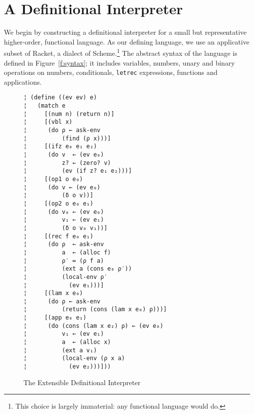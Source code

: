 \section{A Definitional Interpreter}\label{s:interp}

We begin by constructing a definitional interpreter for a small but
representative higher-order, functional language.  As our defining language, we
use an applicative subset of Racket, a dialect of Scheme.\footnote{This choice
is largely immaterial: any functional language would do.} The abstract syntax
of the language is defined in Figure~\ref{f:syntax}; it includes variables,
numbers, unary and binary operations on numbers, conditionals, {\tt letrec}
expressions, functions and applications.

\begin{figure} %
\begin{lstlisting}
¦ (define ((ev ev) e)
¦   (match e
¦     [(num n) (return n)]
¦     [(vbl x)
¦      (do ρ ← ask-env
¦          (find (ρ x)))]    
¦     [(ifz e₀ e₁ e₂) 
¦      (do v  ← (ev e₀)
¦          z? ← (zero? v)
¦          (ev (if z? e₁ e₂)))]
¦     [(op1 o e₀)
¦      (do v ← (ev e₀)
¦          (δ o v))]   
¦     [(op2 o e₀ e₁)
¦      (do v₀ ← (ev e₀)
¦          v₁ ← (ev e₁)
¦          (δ o v₀ v₁))]
¦     [(rec f e₀ e₁) 
¦      (do ρ  ← ask-env
¦          a  ← (alloc f)
¦          ρ′ ≔ (ρ f a)
¦          (ext a (cons e₀ ρ′))
¦          (local-env ρ′
¦            (ev e₁)))]
¦     [(lam x e₀)
¦      (do ρ ← ask-env
¦          (return (cons (lam x e₀) ρ)))]
¦     [(app e₀ e₁)
¦      (do (cons (lam x e₂) ρ) ← (ev e₀)
¦          v₁ ← (ev e₁)
¦          a  ← (alloc x)         
¦          (ext a v₁)
¦          (local-env (ρ x a) 
¦            (ev e₂)))]))
\end{lstlisting}
\caption{The Extensible Definitional Interpreter}
\label{f:interpreter}
\end{figure} %

